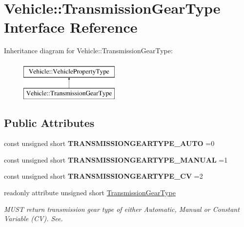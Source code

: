 \hypertarget{interfaceVehicle_1_1TransmissionGearType}{\section{Vehicle\-:\-:Transmission\-Gear\-Type Interface Reference}
\label{interfaceVehicle_1_1TransmissionGearType}
}
Inheritance diagram for Vehicle\-:\-:Transmission\-Gear\-Type\-:\begin{figure}[H]
\begin{center}
\leavevmode
\includegraphics[height=2.000000cm]{interfaceVehicle_1_1TransmissionGearType}
\end{center}
\end{figure}
\subsection*{Public Attributes}
\begin{DoxyCompactItemize}
\item 
\hypertarget{interfaceVehicle_1_1TransmissionGearType_a3a2077d133160e5eaf546ce2bb591dd2}{const unsigned short {\bfseries T\-R\-A\-N\-S\-M\-I\-S\-S\-I\-O\-N\-G\-E\-A\-R\-T\-Y\-P\-E\-\_\-\-A\-U\-T\-O} =0}\label{interfaceVehicle_1_1TransmissionGearType_a3a2077d133160e5eaf546ce2bb591dd2}

\item 
\hypertarget{interfaceVehicle_1_1TransmissionGearType_a0e21e8c261a5b1ae78d989f55d374bb3}{const unsigned short {\bfseries T\-R\-A\-N\-S\-M\-I\-S\-S\-I\-O\-N\-G\-E\-A\-R\-T\-Y\-P\-E\-\_\-\-M\-A\-N\-U\-A\-L} =1}\label{interfaceVehicle_1_1TransmissionGearType_a0e21e8c261a5b1ae78d989f55d374bb3}

\item 
\hypertarget{interfaceVehicle_1_1TransmissionGearType_a79b8302778d807ff4490998589549f00}{const unsigned short {\bfseries T\-R\-A\-N\-S\-M\-I\-S\-S\-I\-O\-N\-G\-E\-A\-R\-T\-Y\-P\-E\-\_\-\-C\-V} =2}\label{interfaceVehicle_1_1TransmissionGearType_a79b8302778d807ff4490998589549f00}

\item 
readonly attribute unsigned short \hyperlink{interfaceVehicle_1_1TransmissionGearType_a75dbfdfc51357d3c59256cb8dd43d7fd}{Transmission\-Gear\-Type}
\begin{DoxyCompactList}\small\item\em M\-U\-S\-T return transmission gear type of either Automatic, Manual or Constant Variable (C\-V). See. \end{DoxyCompactList}\end{DoxyCompactItemize}
